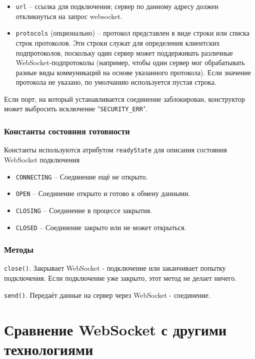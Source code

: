 \begin{itemize}
\item \texttt{url} -- ссылка для подключения; сервер по данному адресу должен откликнуться на запрос websocket.
\item \texttt{protocols} (опционально) -- протокол представлен в виде строки или списка строк протоколов. Эти строки служат для определения клиентских подпротоколов, поскольку один сервер может поддерживать различные WebSocket-подпротоколы (например, чтобы один сервер мог обрабатывать разные виды коммуникаций на основе указанного протокола). Если значение протокола не указано, по умолчанию используется пустая строка.
\end{itemize}

Если порт, на который устанавливается соединение заблокирован, конструктор может выбросить исключение "\texttt{SECURITY\_ERR}".

\subsubsection{Константы состояния готовности}

Константы используются атрибутом \texttt{readyState} для описания состояния WebSocket подключения

\begin{itemize}
\item \texttt{CONNECTING} -- Соединение ещё не открыто.
\item \texttt{OPEN} -- Соединение открыто и готово к обмену данными.
\item \texttt{CLOSING} -- Соединение в процессе закрытия.
\item \texttt{CLOSED} -- Соединение закрыто или не может открыться.
\end{itemize}

\subsubsection{Методы}

\texttt{close()}. Закрывает WebSocket - подключение или заканчивает попытку подключения. Если подключение уже закрыто, этот метод не делает ничего.

\texttt{send()}. Передаёт данные на сервер через WebSocket - соединение.

\section{Сравнение WebSocket с другими технологиями}

